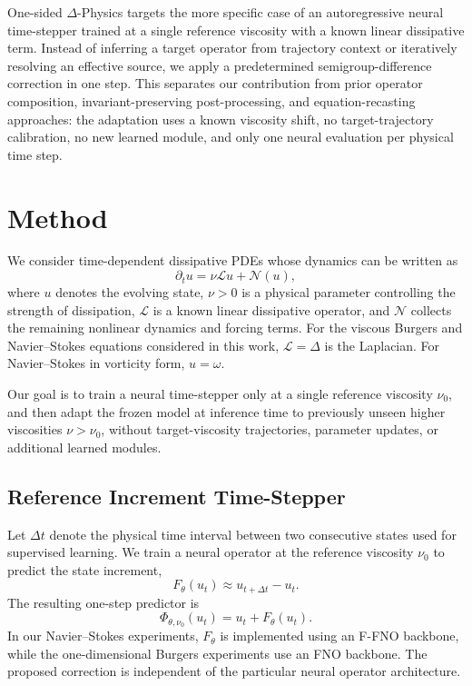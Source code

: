 \documentclass[10pt,twocolumn]{article}
\begin{document}
One-sided $\Delta$-Physics targets the more specific case of an autoregressive neural time-stepper trained at a single reference viscosity with a known linear dissipative term. Instead of inferring a target operator from trajectory context or iteratively resolving an effective source, we apply a predetermined semigroup-difference correction in one step. This separates our contribution from prior operator composition, invariant-preserving post-processing, and equation-recasting approaches: the adaptation uses a known viscosity shift, no target-trajectory calibration, no new learned module, and only one neural evaluation per physical time step.



\section{Method}
\label{sec:method}

We consider time-dependent dissipative PDEs whose dynamics can be written as
\begin{equation}
    \partial_t u
    =
    \nu \mathcal{L}u
    +
    \mathcal{N}(u),
    \label{eq:pde_general}
\end{equation}
where $u$ denotes the evolving state, $\nu>0$ is a physical parameter controlling
the strength of dissipation, $\mathcal{L}$ is a known linear dissipative operator,
and $\mathcal{N}$ collects the remaining nonlinear dynamics and forcing terms.
For the viscous Burgers and Navier--Stokes equations considered in this work,
$\mathcal{L}=\Delta$ is the Laplacian. For Navier--Stokes in vorticity form,
$u=\omega$.

Our goal is to train a neural time-stepper only at a single reference viscosity
$\nu_0$, and then adapt the frozen model at inference time to previously unseen
higher viscosities $\nu>\nu_0$, without target-viscosity trajectories,
parameter updates, or additional learned modules.

\subsection{Reference Increment Time-Stepper}
\label{sec:reference_stepper}

Let $\Delta t$ denote the physical time interval between two consecutive states
used for supervised learning. We train a neural operator at the reference
viscosity $\nu_0$ to predict the state increment,
\begin{equation}
    F_\theta(u_t)
    \approx
    u_{t+\Delta t}-u_t.
\end{equation}
The resulting one-step predictor is
\begin{equation}
    \Phi_{\theta,\nu_0}(u_t)
    =
    u_t + F_\theta(u_t).
    \label{eq:increment_model}
\end{equation}
In our Navier--Stokes experiments, $F_\theta$ is implemented using an
F-FNO backbone, while the one-dimensional Burgers experiments use an FNO
backbone. The proposed correction is independent of the particular neural
operator architecture.
\end{document}
